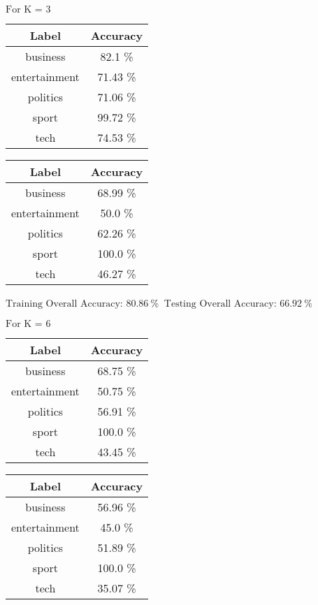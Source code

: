 \documentclass[8pt]{extarticle}
\begin{document}
    $\displaystyle \text{For K = }3$
    \begin{center}
        \quad
    \end{center}
    \begin{center}
        \begin{tabular}{cc}
            \hline
            Label & Accuracy\\
            \hline
            business &   82.1 \% \\
       entertainment &   71.43 \% \\
           politics  &   71.06 \% \\
              sport  &   99.72 \% \\
               tech  &   74.53 \%
         \end{tabular}
         \quad
        \begin{tabular}{cc}
            \hline
            Label & Accuracy\\
            \hline
            business &   68.99 \% \\
        entertainment &  50.0 \% \\
           politics  &   62.26 \% \\
              sport  &   100.0  \% \\
               tech  &   46.27 \%
        \end{tabular}
    \end{center}
    \begin{center}
        $\displaystyle \text{Training Overall Accuracy:\ }80.86\ \%$
        $\displaystyle \ \text{Testing Overall Accuracy:\ }66.92\ \%$
    \end{center}
    \newpage
    $\displaystyle \text{For K = }6$
    \begin{center}
        \quad
    \end{center}
    \begin{center}
        \begin{tabular}{cc}
            \hline
            Label & Accuracy\\
            \hline
            business &   68.75 \% \\
       entertainment &   50.75 \% \\
           politics  &   56.91 \% \\
              sport  &   100.0 \% \\
               tech  &   43.45 \%
         \end{tabular}
         \quad
        \begin{tabular}{cc}
            \hline
            Label & Accuracy\\
            \hline
            business &   56.96 \% \\
        entertainment &  45.0 \% \\
           politics  &   51.89 \% \\
              sport  &   100.0  \% \\
               tech  &   35.07 \%
        \end{tabular}
    \end{center}
\end{document}
